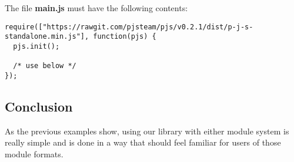 The file \textbf{main.js} must have the following contents:
\begin{lstlisting}[caption=main.js AMD support]
require(["https://rawgit.com/pjsteam/pjs/v0.2.1/dist/p-j-s-standalone.min.js"], function(pjs) {
  pjs.init();

  /* use below */
});
\end{lstlisting}

\subsection{Conclusion}
As the previous examples show, using our library with either module system is really simple and is done in a way that should feel familiar for users of those module formats.

\pagebreak